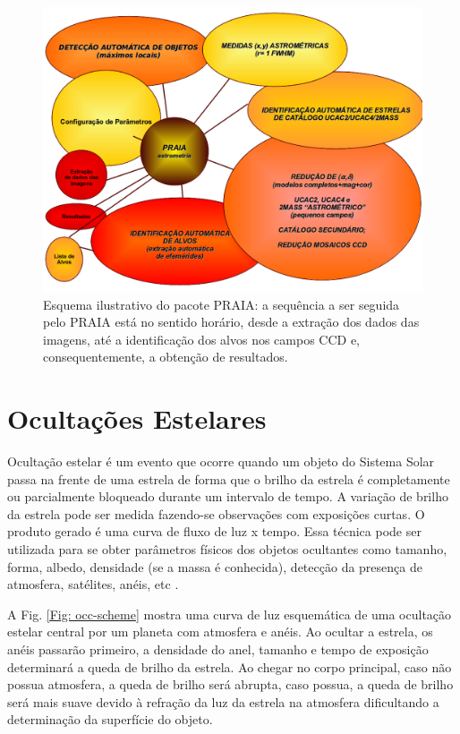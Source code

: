\documentclass[12pt,a4paper]{monografia}
\begin{document}
\begin{figure}[h]
\centering
\includegraphics[scale=0.4]{figuras/PRAIA.png}
\caption[Esquema ilustrativo do pacote PRAIA]{Esquema ilustrativo do pacote PRAIA: a sequência a ser seguida pelo PRAIA está no sentido horário, desde a extração dos dados das imagens, até a identificação dos alvos nos campos CCD e, consequentemente, a obtenção de resultados.}
\label{Fig:PRAIA}
\end{figure}

\chapter{Ocultações Estelares}
\label{Cap: ocultacoes}

\indent \indent Ocultação estelar é um evento que ocorre quando um objeto do Sistema Solar passa na frente de uma estrela de forma que o brilho da estrela é completamente ou parcialmente bloqueado durante um intervalo de tempo. A variação de brilho da estrela pode ser medida fazendo-se observações com exposições curtas. O produto gerado é uma curva de fluxo de luz x tempo. Essa técnica pode ser utilizada para se obter parâmetros físicos dos objetos ocultantes como tamanho, forma, albedo, densidade (se a massa é conhecida), detecção da presença de atmosfera, satélites, anéis, etc \citep{Elliot1979}.

A Fig. \ref{Fig: occ-scheme} mostra uma curva de luz esquemática de uma ocultação estelar central por um planeta com atmosfera e anéis. Ao ocultar a estrela, os anéis passarão primeiro, a densidade do anel, tamanho e tempo de exposição determinará a queda de brilho da estrela. Ao chegar no corpo principal, caso não possua atmosfera, a queda de brilho será abrupta, caso possua, a queda de brilho será mais suave devido à refração da luz da estrela na atmosfera dificultando a determinação da superfície do objeto.
\end{document}
